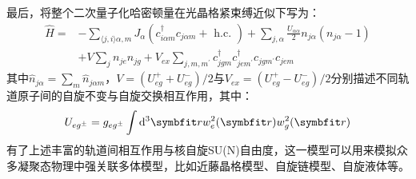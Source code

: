 最后，将整个二次量子化哈密顿量在光晶格紧束缚近似下写为：
\begin{equation}
\begin{aligned}
\hat{H}=&-\sum_{\langle j, i\rangle \alpha, m} J_{\alpha}\left(c_{i \alpha m}^{\dagger} c_{j \alpha m}+\text { h.c. }\right)+\sum_{j, \alpha} \frac{U_{\alpha \alpha}}{2} n_{j \alpha}\left(n_{j \alpha}-1\right) \\
&+V \sum_{j} n_{j e} n_{j g}+V_{e x} \sum_{j, m, m^{\prime}} c_{j g m}^{\dagger} c_{j e m^{\prime}}^{\dagger} c_{j g m^{\prime}} c_{j e m}
\end{aligned}
\end{equation}
其中$\hat{n}_{j\alpha}=\sum_m \hat{n}_{j\alpha m}$，$V=\left(U_{e g}^{+}+U_{e g}^{-}\right) / 2$与$V_{ex}=\left(U_{e g}^{+}-U_{e g}^{-}\right) / 2$分别描述不同轨道原子间的自旋不变与自旋交换相互作用，其中：
\begin{equation}
U_{eg^\pm} = g_{eg^\pm} \int \mathrm{d}^{3} \Vector{r} w_e^2(\Vector{r})w_g^2(\Vector{r})
\end{equation}
有了上述丰富的轨道间相互作用与核自旋SU(N)自由度，这一模型可以用来模拟众多凝聚态物理中强关联多体模型，比如近藤晶格模型、自旋链模型、自旋液体等。

